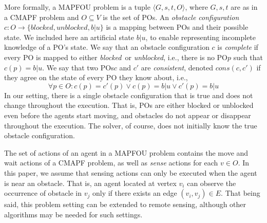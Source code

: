\documentclass[letterpaper]{article} %
\newcommand{\blocked}{\textit{blocked}}
\newcommand{\unblocked}{\textit{unblocked}}
\newcommand{\unknown}{\textit{b}|\textit{u}}
\newcommand{\po}{PO\xspace}
\newcommand{\pos}{POs\xspace}
\newcommand{\cons}{\textit{cons}}
\newcommand{\roni}[1]{{\textcolor{green}{[Roni: #1]}}}
\begin{document}
More formally, a MAPFOU problem is a tuple $\langle G,s,t,O\rangle$,
where $G,s,t$ are as in a CMAPF problem and $O \subseteq V$ is the set of \pos.
An \emph{obstacle configuration} $c:O\rightarrow\{\blocked, \unblocked, \unknown\}$ is a mapping between \pos and their possible state.
We included here an artificial state $\unknown$, to enable representing incomplete knowledge of a \po's state.
We say that an obstacle configuration $c$ is \emph{complete} if every \po is mapped to either \blocked\ or \unblocked, i.e., there is no \po $p$ such that $c(p)=\unknown$.
We say that two \pos $c$ and $c'$ are \emph{consistent}, denoted $\cons(c,c')$ if they agree on the state of every \po they know about, i.e.,
\begin{equation}
    \forall p\in O: c(p)=c'(p)\vee c(p)=\unknown \vee c'(p)=\unknown
    \label{eq:consistent}
\end{equation}
In our setting, there is a single obstacle configuration that is true and does not change throughout the execution. That is, \pos are either blocked or unblocked even before the agents start moving, and obstacles do not appear or disappear throughout the execution. The solver, of course, does not initially know the true obstacle configuration.

The set of actions of an agent in a MAPFOU problem contains the move and wait actions of a CMAPF problem, as well as \emph{sense} actions for each $v \in O$.
In this paper, we assume that sensing actions can only be executed when the agent is near an obstacle. That is, an agent located at vertex $v_i$ can observe the occurrence of obstacle in $v_j$ only if there exists an edge $(v_i, v_j) \in E$. That being said, this problem setting can be extended to remote sensing, although other algorithms may be needed for such settings.
\end{document}
